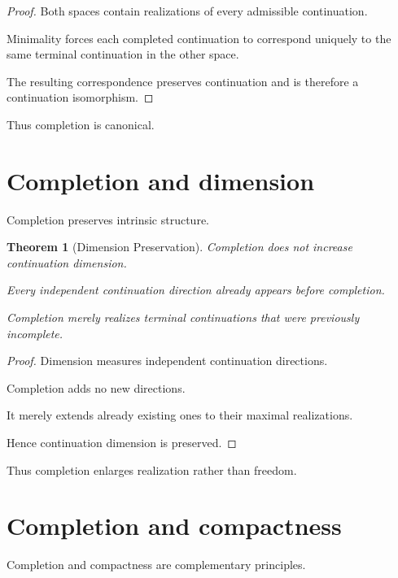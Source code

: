 \documentclass[13pt,openany]{book}
\theoremstyle{plain}
\newtheorem{theorem}{Theorem}[chapter]
\theoremstyle{definition}
\begin{document}
\begin{proof}
Both spaces contain realizations of every admissible continuation.

Minimality forces each completed continuation to correspond uniquely to the
same terminal continuation in the other space.

The resulting correspondence preserves continuation and is therefore a
continuation isomorphism.
\end{proof}

Thus completion is canonical.

\section{Completion and dimension}

Completion preserves intrinsic structure.

\begin{theorem}[Dimension Preservation]
Completion does not increase continuation dimension.

Every independent continuation direction already appears before completion.

Completion merely realizes terminal continuations that were previously
incomplete.
\end{theorem}

\begin{proof}
Dimension measures independent continuation directions.

Completion adds no new directions.

It merely extends already existing ones to their maximal realizations.

Hence continuation dimension is preserved.
\end{proof}

Thus completion enlarges realization rather than freedom.

\section{Completion and compactness}

Completion and compactness are complementary principles.
\end{document}
